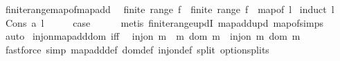 \begin{isabellebody}
%
\isadelimproof
\isanewline
%
\endisadelimproof
\isanewline
{}\isamarkupfalse%
\ finite{\isacharunderscore}{\kern0pt}range{\isacharunderscore}{\kern0pt}map{\isacharunderscore}{\kern0pt}of{\isacharunderscore}{\kern0pt}map{\isacharunderscore}{\kern0pt}add{\isacharcolon}{\kern0pt}\isanewline
\ \ {\isachardoublequoteopen}finite\ {\isacharparenleft}{\kern0pt}range\ f{\isacharparenright}{\kern0pt}\ {\isasymLongrightarrow}\ finite\ {\isacharparenleft}{\kern0pt}range\ {\isacharparenleft}{\kern0pt}f\ {\isacharplus}{\kern0pt}{\isacharplus}{\kern0pt}\ map{\isacharunderscore}{\kern0pt}of\ l{\isacharparenright}{\kern0pt}{\isacharparenright}{\kern0pt}{\isachardoublequoteclose}\isanewline
%
\isadelimproof
%
\endisadelimproof
%
\isatagproof
{}\isamarkupfalse%
\ {\isacharparenleft}{\kern0pt}induct\ l{\isacharparenright}{\kern0pt}\isanewline
{}\isamarkupfalse%
\ {\isacharparenleft}{\kern0pt}Cons\ a\ l{\isacharparenright}{\kern0pt}\isanewline
\ \ \isamarkupfalse%
\ \isamarkupfalse%
\ {\isacharquery}{\kern0pt}case\isanewline
\ \ \ \ \isamarkupfalse%
\ {\isacharparenleft}{\kern0pt}metis\ finite{\isacharunderscore}{\kern0pt}range{\isacharunderscore}{\kern0pt}updI\ map{\isacharunderscore}{\kern0pt}add{\isacharunderscore}{\kern0pt}upd\ map{\isacharunderscore}{\kern0pt}of{\isachardot}{\kern0pt}simps{\isacharparenleft}{\kern0pt}{}{\isacharparenright}{\kern0pt}{\isacharparenright}{\kern0pt}\isanewline
{}\isamarkupfalse%
\ auto%
\endisatagproof
{\isafoldproof}%
%
\isadelimproof
\isanewline
%
\endisadelimproof
\isanewline
{}\isamarkupfalse%
\ inj{\isacharunderscore}{\kern0pt}on{\isacharunderscore}{\kern0pt}map{\isacharunderscore}{\kern0pt}add{\isacharunderscore}{\kern0pt}dom\ {\isacharbrackleft}{\kern0pt}iff{\isacharbrackright}{\kern0pt}{\isacharcolon}{\kern0pt}\isanewline
\ \ {\isachardoublequoteopen}inj{\isacharunderscore}{\kern0pt}on\ {\isacharparenleft}{\kern0pt}m\ {\isacharplus}{\kern0pt}{\isacharplus}{\kern0pt}\ m{\isacharprime}{\kern0pt}{\isacharparenright}{\kern0pt}\ {\isacharparenleft}{\kern0pt}dom\ m{\isacharprime}{\kern0pt}{\isacharparenright}{\kern0pt}\ {\isacharequal}{\kern0pt}\ inj{\isacharunderscore}{\kern0pt}on\ m{\isacharprime}{\kern0pt}\ {\isacharparenleft}{\kern0pt}dom\ m{\isacharprime}{\kern0pt}{\isacharparenright}{\kern0pt}{\isachardoublequoteclose}\isanewline
%
\isadelimproof
\ \ %
\endisadelimproof
%
\isatagproof
{}\isamarkupfalse%
\ {\isacharparenleft}{\kern0pt}fastforce\ simp{\isacharcolon}{\kern0pt}\ map{\isacharunderscore}{\kern0pt}add{\isacharunderscore}{\kern0pt}def\ dom{\isacharunderscore}{\kern0pt}def\ inj{\isacharunderscore}{\kern0pt}on{\isacharunderscore}{\kern0pt}def\ split{\isacharcolon}{\kern0pt}\ option{\isachardot}{\kern0pt}splits{\isacharparenright}{\kern0pt}%

\end{isabellebody}

